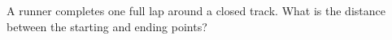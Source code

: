 A runner completes one full lap around a closed track. What is the distance between the starting and ending points?
